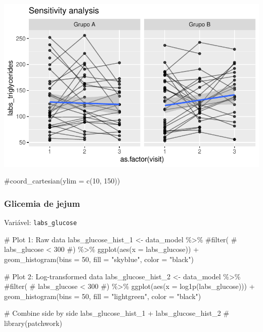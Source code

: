 \documentclass[
  letterpaper,
  DIV=11,
  numbers=noendperiod]{scrartcl}
\newenvironment{Shaded}{\begin{snugshade}}{\end{snugshade}}
\newcommand{\AttributeTok}[1]{\textcolor[rgb]{0.40,0.45,0.13}{#1}}
\newcommand{\CommentTok}[1]{\textcolor[rgb]{0.37,0.37,0.37}{#1}}
\newcommand{\DecValTok}[1]{\textcolor[rgb]{0.68,0.00,0.00}{#1}}
\newcommand{\FunctionTok}[1]{\textcolor[rgb]{0.28,0.35,0.67}{#1}}
\newcommand{\NormalTok}[1]{\textcolor[rgb]{0.00,0.23,0.31}{#1}}
\newcommand{\OtherTok}[1]{\textcolor[rgb]{0.00,0.23,0.31}{#1}}
\newcommand{\SpecialCharTok}[1]{\textcolor[rgb]{0.37,0.37,0.37}{#1}}
\newcommand{\StringTok}[1]{\textcolor[rgb]{0.13,0.47,0.30}{#1}}
\begin{document}
\includegraphics{Outcomes_V1V2V3_files/figure-pdf/labs_triglycerides_6-2.pdf}

\begin{Shaded}
\begin{Highlighting}[]
    \CommentTok{\#coord\_cartesian(ylim = c(10, 150))}
\end{Highlighting}
\end{Shaded}

\subsubsection{Glicemia de jejum}\label{glicemia-de-jejum}

Variável: \texttt{labs\_glucose}

\begin{Shaded}
\begin{Highlighting}[]
\CommentTok{\# Plot 1: Raw data}
\NormalTok{labs\_glucose\_hist\_1 }\OtherTok{\textless{}{-}}\NormalTok{ data\_model }\SpecialCharTok{\%\textgreater{}\%} 
    \CommentTok{\#filter(}
    \CommentTok{\#    labs\_glucose \textless{} 300}
    \CommentTok{\#) \%\textgreater{}\% }
    \FunctionTok{ggplot}\NormalTok{(}\FunctionTok{aes}\NormalTok{(}\AttributeTok{x =}\NormalTok{ labs\_glucose)) }\SpecialCharTok{+} 
    \FunctionTok{geom\_histogram}\NormalTok{(}\AttributeTok{bins =} \DecValTok{50}\NormalTok{, }\AttributeTok{fill =} \StringTok{"skyblue"}\NormalTok{, }\AttributeTok{color =} \StringTok{"black"}\NormalTok{)}

\CommentTok{\# Plot 2: Log{-}transformed data}
\NormalTok{labs\_glucose\_hist\_2 }\OtherTok{\textless{}{-}}\NormalTok{ data\_model }\SpecialCharTok{\%\textgreater{}\%} 
    \CommentTok{\#filter(}
    \CommentTok{\#    labs\_glucose \textless{} 300}
    \CommentTok{\#) \%\textgreater{}\%}
    \FunctionTok{ggplot}\NormalTok{(}\FunctionTok{aes}\NormalTok{(}\AttributeTok{x =} \FunctionTok{log1p}\NormalTok{(labs\_glucose))) }\SpecialCharTok{+} 
    \FunctionTok{geom\_histogram}\NormalTok{(}\AttributeTok{bins =} \DecValTok{50}\NormalTok{, }\AttributeTok{fill =} \StringTok{"lightgreen"}\NormalTok{, }\AttributeTok{color =} \StringTok{"black"}\NormalTok{)}

\CommentTok{\# Combine side by side}
\NormalTok{labs\_glucose\_hist\_1 }\SpecialCharTok{+}\NormalTok{ labs\_glucose\_hist\_2 }\CommentTok{\# library(patchwork)}
\end{Highlighting}
\end{Shaded}
\end{document}
